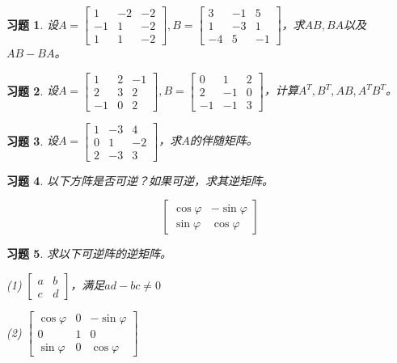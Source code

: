 \documentclass[a4paper]{book}
\newtheorem{ex}{习题}[chapter]
\newcommand{\enum}{\begin{list}{}{\setlength{\leftmargin}{0pt} \setlength{\itemindent}{2.5em} \setlength{\listparindent}{2em}}}
\begin{document}
\begin{ex} \label{ex:3.3}
设$A = \begin{bmatrix} 1 & -2 & -2 \\ -1 & 1 & -2 \\ 1 & 1 & -2 \end{bmatrix}, B = \begin{bmatrix} 3 & -1 & 5 \\ 1 & -3 & 1 \\ -4 & 5 & -1 \end{bmatrix}$，求$AB,BA$以及$AB-BA$。
\end{ex}

\begin{ex} \label{ex:3.4}
设$A = \begin{bmatrix} 1 & 2 & -1 \\ 2 & 3 & 2 \\ -1 & 0 & 2 \end{bmatrix}, B = \begin{bmatrix} 0 & 1 & 2 \\ 2 & -1 & 0 \\ -1 & -1 & 3 \end{bmatrix}$，计算$A^T,B^T,AB,A^TB^T$。
\end{ex}

\begin{ex} \label{ex:3.5}
设$A = \begin{bmatrix} 1 & -3 & 4 \\ 0 & 1 & -2 \\ 2 & -3 & 3 \end{bmatrix}$，求$A$的伴随矩阵。
\end{ex}

\begin{ex} \label{ex:3.6}
以下方阵是否可逆？如果可逆，求其逆矩阵。

$$\begin{bmatrix} \cos\varphi & -\sin\varphi \\ \sin\varphi & \cos\varphi \end{bmatrix}$$
\end{ex}

\begin{ex} \label{ex:3.7}
求以下可逆阵的逆矩阵。

\enum
\item[(1)] $\begin{bmatrix} a & b \\ c & d \end{bmatrix}$，满足$ad-bc\neq 0$
\item[(2)] $\begin{bmatrix}  \cos\varphi & 0 & -\sin\varphi \\ 0 & 1 & 0 \\ \sin\varphi & 0 & \cos\varphi \end{bmatrix}$
\end{list}
\end{ex}
\end{document}
